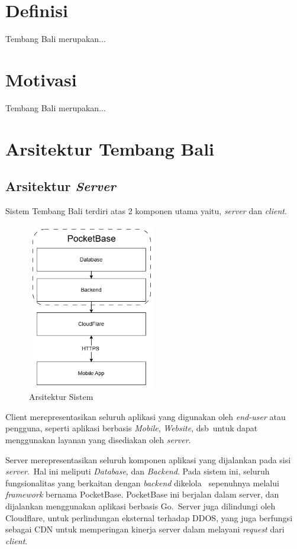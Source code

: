 \documentclass[a4paper, 12pt]{article}
\begin{document}
\section{Definisi}
Tembang Bali merupakan...

\section{Motivasi}
Tembang Bali merupakan...

\section{Arsitektur Tembang Bali}

\subsection{Arsitektur \textit{Server}}
Sistem Tembang Bali terdiri atas 2 komponen utama yaitu, \textit{server} dan \textit{client}.

\begin{figure}[h]
    \centering
    \includegraphics[width=0.5\textwidth]{assets/hla.png}
    \caption{Arsitektur Sistem}
\end{figure}

Client merepresentasikan seluruh aplikasi yang digunakan oleh \textit{end-user} atau pengguna, seperti aplikasi berbasis \textit{Mobile}, \textit{Website}, dsb\
untuk dapat menggunakan layanan yang disediakan oleh \textit{server}.

Server merepresentasikan seluruh komponen aplikasi yang dijalankan pada sisi \textit{server}.\
Hal ini meliputi \textit{Database}, dan \textit{Backend}. Pada sistem ini, seluruh fungsionalitas yang berkaitan dengan \textit{backend} dikelola \
sepenuhnya melalui \textit{framework} bernama PocketBase. PocketBase ini berjalan dalam server, dan dijalankan menggunakan aplikasi berbasis Go.\
Server juga dilindungi oleh Cloudflare, untuk perlindungan eksternal terhadap DDOS, yang juga berfungsi sebagai CDN untuk memperingan kinerja server dalam melayani \textit{request} dari \textit{client}.
\end{document}
